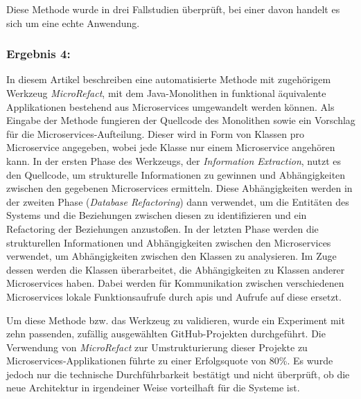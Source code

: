 Diese Methode wurde in drei Fallstudien überprüft, bei einer davon handelt es sich um eine echte Anwendung.


\subsubsection{Ergebnis 4:  \cite{arh-result-no-filter-4}}

In diesem Artikel beschreiben  eine automatisierte Methode mit zugehörigem Werkzeug \emph{MicroRefact}, mit dem Java-Monolithen in funktional äquivalente Applikationen bestehend aus Microservices umgewandelt werden können.
Als Eingabe der Methode fungieren der Quellcode des Monolithen sowie ein Vorschlag für die Microservices-Aufteilung. Dieser wird in Form von Klassen pro Microservice angegeben, wobei jede Klasse nur einem Microservice angehören kann.
In der ersten Phase des Werkzeugs, der \emph{Information Extraction}, nutzt es den Quellcode, um strukturelle Informationen zu gewinnen und Abhängigkeiten zwischen den gegebenen Microservices ermitteln.
Diese Abhängigkeiten werden in der zweiten Phase (\emph{Database Refactoring}) dann verwendet, um die Entitäten des Systems und die Beziehungen zwischen diesen zu identifizieren und ein Refactoring der Beziehungen anzustoßen.
In der letzten Phase werden die strukturellen Informationen und Abhängigkeiten zwischen den Microservices verwendet, um Abhängigkeiten zwischen den Klassen zu analysieren.
Im Zuge dessen werden die Klassen überarbeitet, die Abhängigkeiten zu Klassen anderer Microservices haben.
Dabei werden für Kommunikation zwischen verschiedenen Microservices lokale Funktionsaufrufe durch \glspl{api} und Aufrufe auf diese ersetzt.

Um diese Methode bzw. das Werkzeug zu validieren, wurde ein Experiment mit zehn passenden, zufällig ausgewählten GitHub-Projekten durchgeführt.
Die Verwendung von \emph{MicroRefact} zur Umstrukturierung dieser Projekte zu Microservices-Applikationen führte zu einer Erfolgsquote von 80\%.
Es wurde jedoch nur die technische Durchführbarkeit bestätigt und nicht überprüft, ob die neue Architektur in irgendeiner Weise vorteilhaft für die Systeme ist.

%

